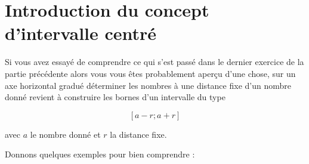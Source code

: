 \documentclass[a4paper,11pt]{book}
\begin{document}
\clearpage


\section{Introduction du concept d'intervalle centré}
\label{sec:orgda4fd9d}
\label{orgc8b3a2f}
\label{page:sec2.4.1intro-disk}

Si vous avez essayé de comprendre ce qui s'est passé dans le
dernier exercice de la partie précédente alors vous vous êtes
probablement aperçu d'une chose, sur un axe horizontal gradué
déterminer les nombres à une distance fixe d'un nombre
donné revient à construire les bornes d'un intervalle du
type 

\[[a - r ; a + r]\]

avec \(a\) le nombre donné et \(r\) la distance fixe.

Donnons quelques exemples pour bien comprendre :
\end{document}
